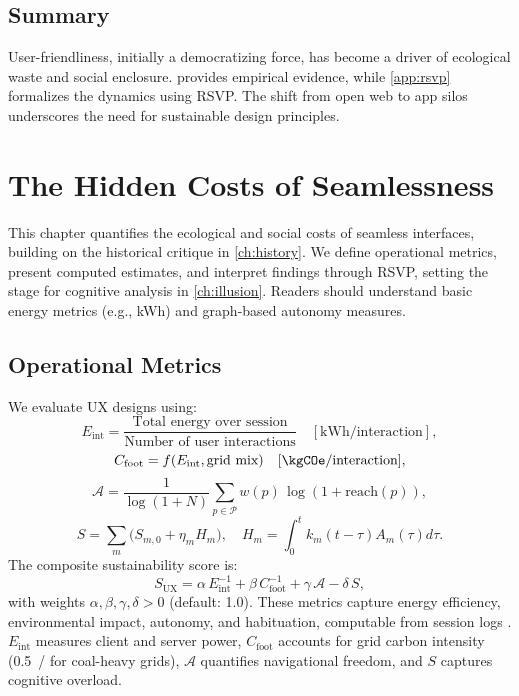 \documentclass[openany]{book}
\newcommand{\Sent}{S} %
\newcommand{\Eint}{E_{\mathrm{int}}} %
\newcommand{\Cfoot}{C_{\mathrm{foot}}} %
\newcommand{\Auton}{\mathcal{A}} %
\newcommand{\SUX}{S_{\mathrm{UX}}} %
\newcommand{\kWh}{\mathrm{kWh}}
\begin{document}
\section{Summary}
User-friendliness, initially a democratizing force, has become a driver of ecological waste and social enclosure.  provides empirical evidence, while \cref{app:rsvp} formalizes the dynamics using RSVP. The shift from open web to app silos underscores the need for sustainable design principles.

\chapter{The Hidden Costs of Seamlessness}
\label{ch:hidden-costs}

This chapter quantifies the ecological and social costs of seamless interfaces, building on the historical critique in \cref{ch:history}. We define operational metrics, present computed estimates, and interpret findings through RSVP, setting the stage for cognitive analysis in \cref{ch:illusion}. Readers should understand basic energy metrics (e.g., kWh) and graph-based autonomy measures.

\section{Operational Metrics}
\label{sec:metrics-def}
We evaluate UX designs using:
\begin{equation}
\Eint = \frac{\text{Total energy over session}}{\text{Number of user interactions}} \quad [\kWh/\text{interaction}],
\end{equation}
\begin{equation}
\Cfoot = f(\Eint, \text{grid mix}) \quad [\kgCOe/\text{interaction}],
\end{equation}
\begin{equation}
\Auton = \frac{1}{\log(1+N)}\sum_{p\in \mathcal{P}} w(p)\,\log(1+\mathrm{reach}(p)),
\end{equation}
\begin{equation}
\Sent = \sum_m \big(S_{m,0} + \eta_m H_m\big), \quad H_m = \int_0^t k_m(t-\tau) A_m(\tau) d\tau.
\end{equation}
The composite sustainability score is:
\begin{equation}
\label{eq:SUX}
\SUX = \alpha\,\Eint^{-1} + \beta\,\Cfoot^{-1} + \gamma\,\Auton - \delta\,\Sent,
\end{equation}
with weights \(\alpha, \beta, \gamma, \delta > 0\) (default: 1.0). These metrics capture energy efficiency, environmental impact, autonomy, and habituation, computable from session logs \citep{extentia2024}. \(\Eint\) measures client and server power, \(\Cfoot\) accounts for grid carbon intensity (\SI{0.5}{\kgCOe/\kWh} for coal-heavy grids), \(\Auton\) quantifies navigational freedom, and \(\Sent\) captures cognitive overload.
\end{document}
